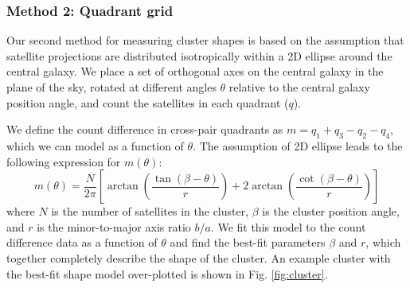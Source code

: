 \documentclass[fleqn,usenatbib]{mnras}
\begin{document}
\subsubsection{Method 2: Quadrant grid}

Our second method for measuring cluster shapes is based on the assumption that satellite projections are distributed isotropically within a 2D ellipse around the central galaxy. We place a set of orthogonal axes on the central galaxy in the plane of the sky, rotated at different angles $\theta$ relative to the central galaxy position angle, and count the satellites in each quadrant ($q$).

We define the count difference in cross-pair quadrants as $m = q_1 + q_3 - q_2 - q_4$, which we can model as a function of $\theta$. The assumption of 2D ellipse leads to the following expression for $m(\theta)$:
\begin{equation}
m(\theta) = \frac{N}{2\pi}\left[ \arctan\left(\frac{\tan(\beta - \theta)}{r}\right) + 2 \arctan\left(\frac{\cot(\beta - \theta)}{r}\right) \right]
\end{equation}
where $N$ is the number of satellites in the cluster, $\beta$ is the cluster position angle, and $r$ is the minor-to-major axis ratio $b/a$. We fit this model to the count difference data as a function of $\theta$ and find the best-fit parameters $\beta$ and $r$, which together completely describe the shape of the cluster. An example cluster with the best-fit shape model over-plotted is shown in Fig. \ref{fig:cluster}.
\end{document}

